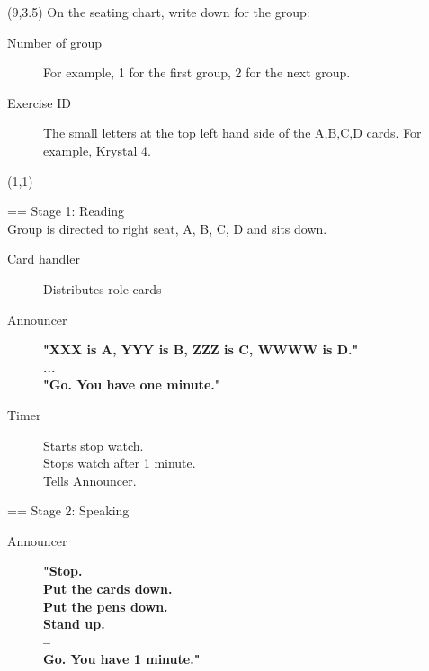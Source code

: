 \documentclass[a4paper]{article}
\begin{document}

\TPshowboxestrue
\begin{textblock}{5}(9,3.5)
\large On the seating chart, write down for the group:
\begin{description}
\item [Number of group] For example, 1 for the first group, 2 for the next group.
\item [Exercise ID] The small letters at the top left hand side of the A,B,C,D cards. For example, Krystal 4.
\end{description}
\end{textblock}
\TPshowboxesfalse

\begin{textblock}{14}(1,1)

\Huge == Stage 1: Reading\\

\large \mdseries
Group is directed to right seat, A, B, C, D and sits down.\\

\begin{description}

\item [Card handler] Distributes role cards\\
\item [Announcer]
\Large \bfseries
	"XXX is A, YYY is B, ZZZ is C, WWWW is D."\\
	...\\
	"Go. You have one minute."\\
\large \mdseries
\item [Timer]	Starts stop watch.\\
	Stops watch after 1 minute.\\
	Tells Announcer.\\

\end{description}

\Huge == Stage 2: Speaking\\

\large \mdseries

\begin{description}

\item [Announcer]
\Large \bfseries
	"Stop.\\
	Put the cards down.\\
	Put the pens down.\\
	Stand up.\\
	--\\
	Go. You have 1 minute."\\


\end{description}
\end{textblock}
\end{document}
